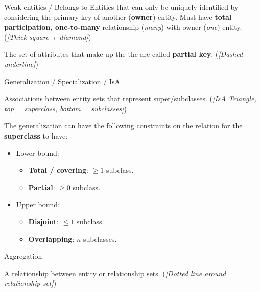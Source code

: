 \begin{definition}
    {Weak entities / Belongs to}
    Entities that can only be uniquely identified by considering the primary key of another (\textbf{owner}) entity. Must have \textbf{total participation, one-to-many} relationship (\textit{many}) with owner (\textit{one}) entity. (\textit{[Thick square + diamond]})

    The set of attributes that make up the the  are called \textbf{partial key}. (\textit{[Dashed underline]})
\end{definition}

\begin{definition}
    {Generalization / Specialization / IsA}

    Associations between entity sets that represent super/subclasses. (\textit{[IsA Triangle, top = superclass, bottom = subclasses]})

    The generalization can have the following constraints on the relation for the \textbf{superclass} to have:
    \begin{itemize}
        \item Lower bound:
              \begin{itemize}
                  \item \textbf{Total / covering}: $\geq 1$ subclass.
                  \item \textbf{Partial}: $\geq 0$ subclass.
              \end{itemize}
        \item Upper bound:
              \begin{itemize}
                  \item \textbf{Disjoint}: $\leq 1$ subclass.
                  \item \textbf{Overlapping}: $n$ subclasses.
              \end{itemize}
    \end{itemize}
\end{definition}

\begin{definition}
    {Aggregation}

    A relationship between entity or relationship sets. (\textit{[Dotted line around relationship set]})
\end{definition}